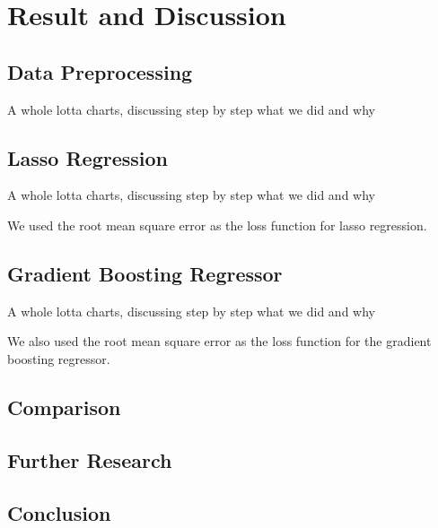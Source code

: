 \section{Result and Discussion}
\subsection{Data Preprocessing}
A whole lotta charts, discussing step by step what we did and why
\subsection{Lasso Regression}
A whole lotta charts, discussing step by step what we did and why

We used the root mean square error as the loss function for lasso regression.
\subsection{Gradient Boosting Regressor}
A whole lotta charts, discussing step by step what we did and why

We also used the root mean square error as the loss function for the gradient boosting regressor.
\subsection{Comparison}

\subsection{Further Research}
\subsection{Conclusion}
